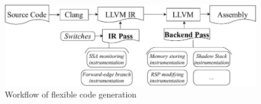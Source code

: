 \begin{figure}[htbp]
\centerline{\includegraphics[scale=0.42]{figures/fg-codegen.pdf}}
\caption{ Workflow of flexible code generation}\label{fg-codegen}
\vspace{-8pt}
\end{figure}
